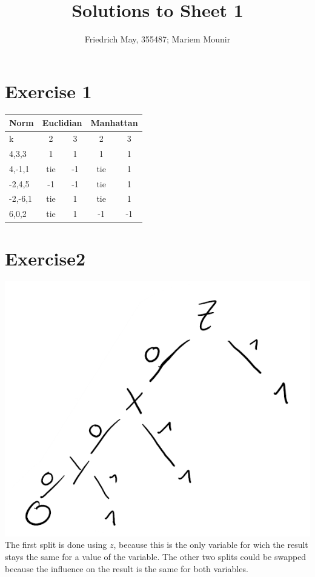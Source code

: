 \documentclass[a4paper,graphics,11pt,notitlepage]{scrartcl}
\title{Solutions to Sheet 1}
\author{Friedrich May, 355487; Mariem Mounir}
\begin{document}
  \vspace{-5ex}
  \maketitle
  \section*{Exercise 1}
  \begin{tabular}{l|c|c|c|c}
    Norm&\multicolumn{2}{c}{Euclidian}&\multicolumn{2}{c}{Manhattan}\\\hline
    k&2&3&2&3\\\hline
    4,3,3&1&1&1&1\\
    4,-1,1&tie&-1&tie&1\\
    -2,4,5&-1&-1&tie&1\\
    -2,-6,1&tie&1&tie&1\\
    6,0,2&tie&1&-1&-1
  \end{tabular}
\section*{Exercise2}
\includegraphics[scale=0.5]{E2Tree.png}
The first split is done using $z$, because this is the only variable for wich the result stays the same for a value of the variable.
The other two splits could be swapped because the influence on the result is the same for both variables.
\end{document}
